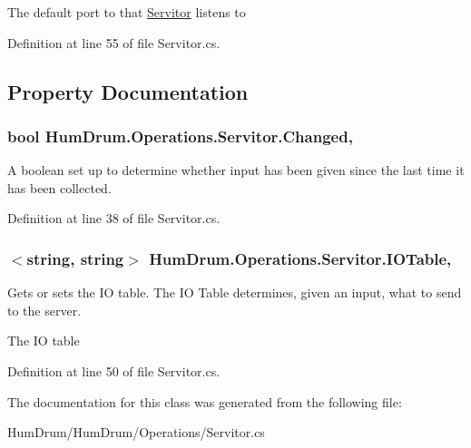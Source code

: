 The default port to that \hyperlink{classHumDrum_1_1Operations_1_1Servitor}{Servitor} listens to 



Definition at line 55 of file Servitor.\+cs.



\subsection{Property Documentation}
\hypertarget{classHumDrum_1_1Operations_1_1Servitor_aacd5394a7844c38e5d4bfd96b00deefe}{}
\subsubsection[{Changed}]{\setlength{\rightskip}{0pt plus 5cm}bool Hum\+Drum.\+Operations.\+Servitor.\+Changed\hspace{0.3cm}{\ttfamily [get]}, {\ttfamily [set]}}\label{classHumDrum_1_1Operations_1_1Servitor_aacd5394a7844c38e5d4bfd96b00deefe}


A boolean set up to determine whether input has been given since the last time it has been collected. 



Definition at line 38 of file Servitor.\+cs.

\hypertarget{classHumDrum_1_1Operations_1_1Servitor_a01c71b67a5ca6154fd1938106b17ebf5}{}
\subsubsection[{I\+O\+Table}]{$<$string, string$>$ Hum\+Drum.\+Operations.\+Servitor.\+I\+O\+Table\hspace{0.3cm}{\ttfamily [get]}, {\ttfamily [set]}}\label{classHumDrum_1_1Operations_1_1Servitor_a01c71b67a5ca6154fd1938106b17ebf5}


Gets or sets the I\+O table. The I\+O Table determines, given an input, what to send to the server. 

The I\+O table

Definition at line 50 of file Servitor.\+cs.



The documentation for this class was generated from the following file\+:\begin{DoxyCompactItemize}
\item 
Hum\+Drum/\+Hum\+Drum/\+Operations/Servitor.\+cs\end{DoxyCompactItemize}
